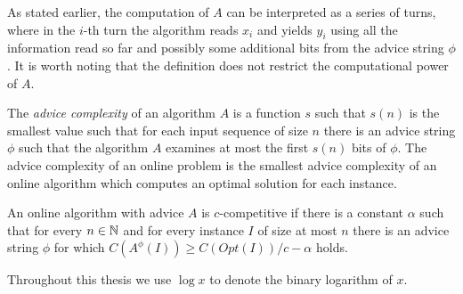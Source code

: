 As stated earlier, the computation of $A$ can be interpreted as a series
of turns, where in the $i$-th turn the algorithm reads $x_i$ and yields
$y_i$ using all the information read so far and possibly some additional
bits from the advice string $\phi$. It is worth noting that the definition
does not restrict the computational power of $A$.

\begin{definition}\label{def:advice-complexity}
    The \emph{advice complexity} of an algorithm $A$ is a function $s$
    such that $s(n)$ is the smallest value such that for each input
    sequence of size $n$ there is an advice string $\phi$ such that the
    algorithm $A$ examines at most the first $s(n)$ bits of $\phi$. The
    advice complexity of an online problem is the smallest advice
    complexity of an online algorithm which computes an optimal solution
    for each instance.
\end{definition}

\begin{definition}\label{def:advice-competitive}
    An online algorithm with advice $A$ is $c$-competitive if there is a
    constant $\alpha$ such that for every $n \in \mathbb{N}$ and for every
    instance $I$ of size at most $n$ there is an advice string $\phi$ for
    which $C(A^\phi(I)) \geq C(Opt(I)) / c - \alpha$ holds.
\end{definition}

Throughout this thesis we use $\log x$ to denote the binary logarithm of
$x$.

